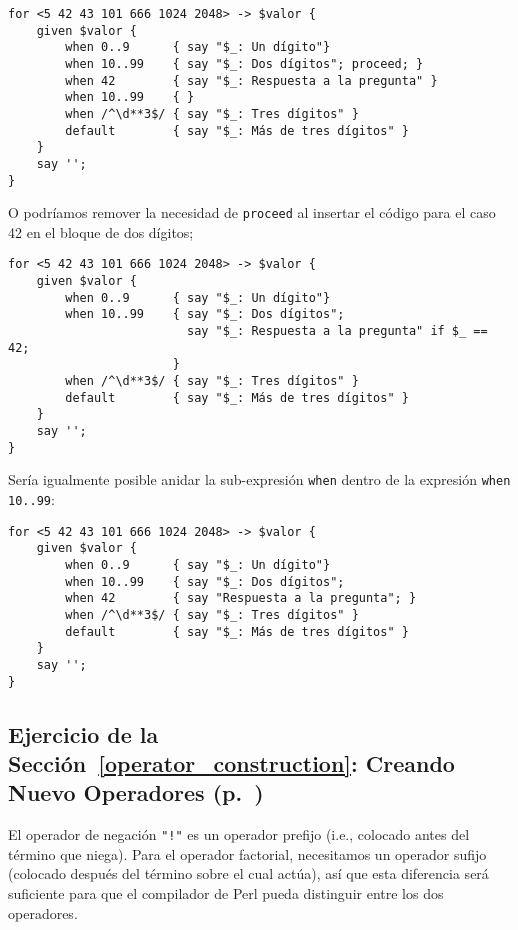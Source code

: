 \begin{verbatim}
for <5 42 43 101 666 1024 2048> -> $valor {
    given $valor {
        when 0..9      { say "$_: Un dígito"}
        when 10..99    { say "$_: Dos dígitos"; proceed; }
        when 42        { say "$_: Respuesta a la pregunta" }
        when 10..99    { }
        when /^\d**3$/ { say "$_: Tres dígitos" }
        default        { say "$_: Más de tres dígitos" }
    }
    say '';
}
\end{verbatim}

O podríamos remover la necesidad de {\tt proceed} al insertar
el código para el caso 42 en el bloque de dos dígitos;

\begin{verbatim}
for <5 42 43 101 666 1024 2048> -> $valor {
    given $valor {
        when 0..9      { say "$_: Un dígito"}
        when 10..99    { say "$_: Dos dígitos";
                         say "$_: Respuesta a la pregunta" if $_ == 42;
                       }
        when /^\d**3$/ { say "$_: Tres dígitos" }
        default        { say "$_: Más de tres dígitos" }
    }
    say '';
}
\end{verbatim}

Sería igualmente posible anidar la sub-expresión \verb|when|
dentro de la expresión \verb|when 10..99|:

\begin{verbatim}
for <5 42 43 101 666 1024 2048> -> $valor {
    given $valor {
        when 0..9      { say "$_: Un dígito"}
        when 10..99    { say "$_: Dos dígitos";
        when 42        { say "Respuesta a la pregunta"; }
        when /^\d**3$/ { say "$_: Tres dígitos" }
        default        { say "$_: Más de tres dígitos" }
    }
    say '';
}
\end{verbatim}

\subsection{Ejercicio de la Sección~\ref{operator_construction}: Creando Nuevo Operadores (p.~\pageref{fact_operator})}
\label{sol_fact_operator}

El operador de negación \verb|"!"| es un operador prefijo (i.e., colocado
antes del término que niega). Para el operador factorial, necesitamos
un operador sufijo (colocado después del término sobre el cual actúa),
así que esta diferencia será suficiente para que el compilador 
de Perl pueda distinguir entre los dos operadores.

